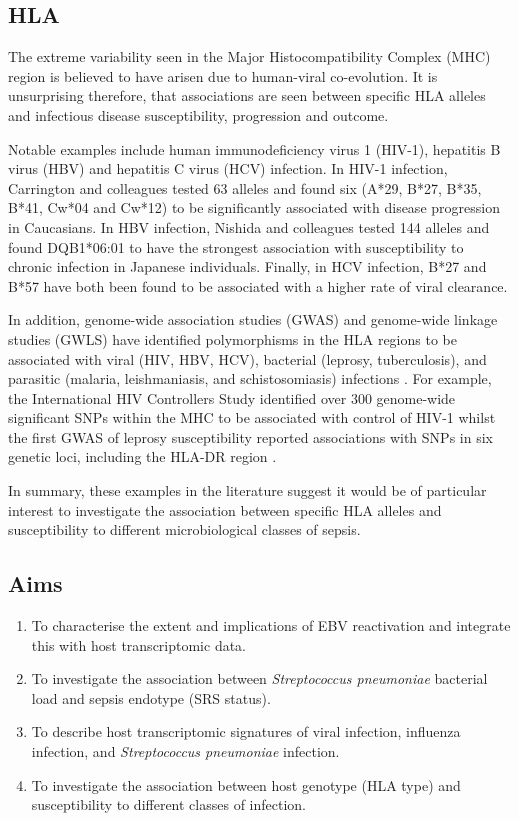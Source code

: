\subsection{HLA}
The extreme variability seen in the Major Histocompatibility Complex (MHC) region is believed to have arisen due to human-viral co-evolution. It is unsurprising therefore, that associations are seen between specific HLA alleles and infectious disease susceptibility, progression and outcome. 

Notable examples include human immunodeficiency virus 1 (HIV-1), hepatitis B virus (HBV) and hepatitis C virus (HCV) infection. In HIV-1 infection, Carrington and colleagues \parencite{Carrington1999} tested 63 alleles and found six (A*29, B*27, B*35, B*41, Cw*04 and Cw*12) to be significantly associated with disease progression in Caucasians. In HBV infection, Nishida and colleagues \parencite{Nishida2016} tested 144 alleles and found DQB1*06:01 to have the strongest association with susceptibility to chronic infection in Japanese individuals. Finally, in HCV infection, B*27 \parencite{Neumann-Haefelin2006} and B*57 \parencite{Kim2011} have both been found to be associated with a higher rate of viral clearance. 

In addition, genome-wide association studies (GWAS) and genome-wide linkage studies (GWLS) have identified polymorphisms in the HLA regions to be associated with viral (HIV, HBV, HCV), bacterial (leprosy, tuberculosis), and parasitic (malaria, leishmaniasis, and schistosomiasis) infections \parencite{Blackwell2009}. For example, the International HIV Controllers Study \parencite{Pereyra2010} identified over 300 genome-wide significant SNPs within the MHC to be associated with control of HIV-1 whilst the first GWAS of leprosy susceptibility reported associations with SNPs in six genetic loci, including the HLA-DR region \parencite{Zhang2009}.  

In summary, these examples in the literature suggest it would be of particular interest to investigate the association between specific HLA alleles and susceptibility to different microbiological classes of sepsis. 

\subsection{Aims}

\begin{enumerate}
	\item To characterise the extent and implications of EBV reactivation and integrate this with host transcriptomic data.
	\item To investigate the association between \textit{Streptococcus pneumoniae} bacterial load and sepsis endotype (SRS status).
	\item To describe host transcriptomic signatures of viral infection, influenza infection, and \textit{Streptococcus pneumoniae} infection.
	\item To investigate the association between host genotype (HLA type) and susceptibility to different classes of infection.
\end{enumerate}

